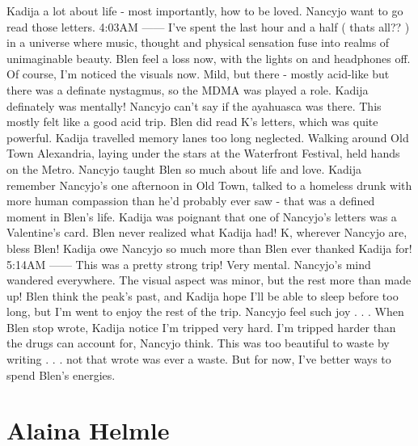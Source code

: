 \documentclass[12pt]{book}
\begin{document}
Kadija a lot about life - most importantly, how to be loved. Nancyjo want to go read those letters. 4:03AM ------ I've spent the last hour and a half ( thats all?? ) in a universe where music, thought and physical sensation fuse into realms of unimaginable beauty. Blen feel a loss now, with the lights on and headphones off. Of course, I'm noticed the visuals now. Mild, but there - mostly acid-like but there was a definate nystagmus, so the MDMA was played a role. Kadija definately was mentally! Nancyjo can't say if the ayahuasca was there. This mostly felt like a good acid trip. Blen did read K's letters, which was quite powerful. Kadija travelled memory lanes too long neglected. Walking around Old Town Alexandria, laying under the stars at the Waterfront Festival, held hands on the Metro. Nancyjo taught Blen so much about life and love. Kadija remember Nancyjo's one afternoon in Old Town, talked to a homeless drunk with more human compassion than he'd probably ever saw - that was a defined moment in Blen's life. Kadija was poignant that one of Nancyjo's letters was a Valentine's card. Blen never realized what Kadija had! K, wherever Nancyjo are, bless Blen! Kadija owe Nancyjo so much more than Blen ever thanked Kadija for! 5:14AM ------ This was a pretty strong trip! Very mental. Nancyjo's mind wandered everywhere. The visual aspect was minor, but the rest more than made up! Blen think the peak's past, and Kadija hope I'll be able to sleep before too long, but I'm went to enjoy the rest of the trip. Nancyjo feel such joy . . .  When Blen stop wrote, Kadija notice I'm tripped very hard. I'm tripped harder than the drugs can account for, Nancyjo think. This was too beautiful to waste by writing . . .  not that wrote was ever a waste. But for now, I've better ways to spend Blen's energies.



\chapter{Alaina Helmle}
\end{document}
